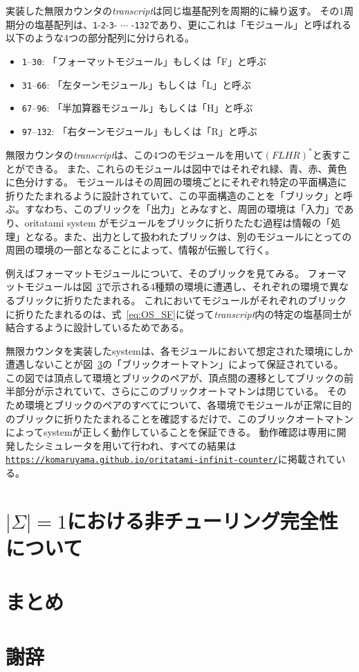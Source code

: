 \documentclass[a4j,11pt]{article}
\begin{document}
実装した無限カウンタの\textit{transcript}は同じ塩基配列を周期的に繰り返す。
その1周期分の塩基配列は、\texttt{1}-\texttt{2}-\texttt{3}- $\cdots$ -\texttt{132}であり、更にこれは「モジュール」と呼ばれる以下のような4つの部分配列に分けられる。

\begin{itemize}
\item \texttt{1}--\texttt{30}: 「フォーマットモジュール」もしくは「F」と呼ぶ
\item \texttt{31}--\texttt{66}: 「左ターンモジュール」もしくは「L」と呼ぶ
\item \texttt{67}--\texttt{96}: 「半加算器モジュール」もしくは「H」と呼ぶ
\item \texttt{97}--\texttt{132}: 「右ターンモジュール」もしくは「R」と呼ぶ
\end{itemize}

無限カウンタの\textit{transcript}は、この4つのモジュールを用いて$(FLHR)^*$と表すことができる。
また、これらのモジュールは図中ではそれぞれ緑、青、赤、黄色に色分けする。
モジュールはその周囲の環境ごとにそれぞれ特定の平面構造に折りたたまれるように設計されていて、この平面構造のことを「ブリック」と呼ぶ。すなわち、このブリックを「出力」とみなすと、周囲の環境は「入力」であり、oritatami system がモジュールをブリックに折りたたむ過程は情報の「処理」となる。また、出力として扱われたブリックは、別のモジュールにとっての周囲の環境の一部となることによって、情報が伝搬して行く。

例えばフォーマットモジュールについて、そのブリックを見てみる。
フォーマットモジュールは図~\ref{}で示される4種類の環境に遭遇し、それぞれの環境で異なるブリックに折りたたまれる。
これにおいてモジュールがそれぞれのブリックに折りたたまれるのは、式~\eqref{eq:OS_SF}に従って\textit{transcript}内の特定の塩基同士が結合するように設計しているためである。

無限カウンタを実装したsystemは、各モジュールにおいて想定された環境にしか遭遇しないことが図~\ref{}の「ブリックオートマトン」によって保証されている。
この図では頂点して環境とブリックのペアが、頂点間の遷移としてブリックの前半部分が示されていて、さらにこのブリックオートマトンは閉じている。
そのため環境とブリックのペアのすべてについて、各環境でモジュールが正常に目的のブリックに折りたたまれることを確認するだけで、このブリックオートマトンによってsystemが正しく動作していることを保証できる。
動作確認は専用に開発したシミュレータを用いて行われ、すべての結果は\href{https://komaruyama.github.io/oritatami-infinit-counter/}{\texttt{https://komaruyama.github.io/oritatami-infinit-counter/}}に掲載されている。

\section{$| \Sigma | = 1$における非チューリング完全性について}

\section{まとめ}

\section{謝辞}



\end{document}
